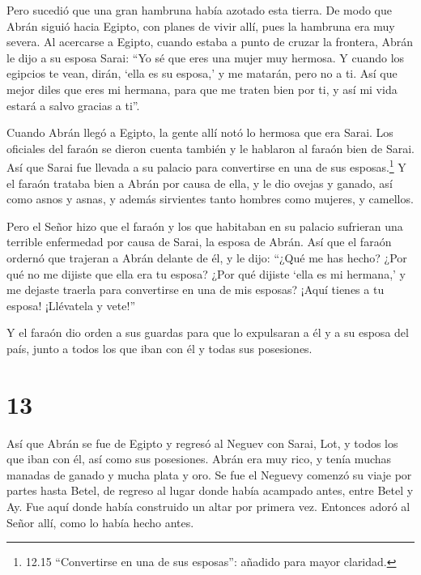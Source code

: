  Pero sucedió que una gran hambruna había azotado esta
tierra. De modo que Abrán siguió hacia Egipto, con planes de vivir allí,
pues la hambruna era muy severa.  Al acercarse a Egipto,
cuando estaba a punto de cruzar la frontera, Abrán le dijo a su esposa
Sarai: ``Yo sé que eres una mujer muy hermosa.  Y cuando
los egipcios te vean, dirán, `ella es su esposa,' y me matarán, pero no
a ti.  Así que mejor diles que eres mi hermana, para que me
traten bien por ti, y así mi vida estará a salvo gracias a ti''.

 Cuando Abrán llegó a Egipto, la gente allí notó lo hermosa
que era Sarai.  Los oficiales del faraón se dieron cuenta
también y le hablaron al faraón bien de Sarai. Así que Sarai fue llevada
a su palacio para convertirse en una de sus esposas.\footnote{12.15
  ``Convertirse en una de sus esposas'': añadido para mayor claridad.}
 Y el faraón trataba bien a Abrán por causa de ella, y le
dio ovejas y ganado, así como asnos y asnas, y además sirvientes tanto
hombres como mujeres, y camellos.

 Pero el Señor hizo que el faraón y los que habitaban en su
palacio sufrieran una terrible enfermedad por causa de Sarai, la esposa
de Abrán.  Así que el faraón ordernó que trajeran a Abrán
delante de él, y le dijo: ``¿Qué me has hecho? ¿Por qué no me dijiste
que ella era tu esposa?  ¿Por qué dijiste `ella es mi
hermana,' y me dejaste traerla para convertirse en una de mis esposas?
¡Aquí tienes a tu esposa! ¡Llévatela y vete!''

 Y el faraón dio orden a sus guardas para que lo expulsaran
a él y a su esposa del país, junto a todos los que iban con él y todas
sus posesiones.

\hypertarget{section-12}{%
\section{13}\label{section-12}}

 Así que Abrán se fue de Egipto y regresó al Neguev con
Sarai, Lot, y todos los que iban con él, así como sus posesiones.
 Abrán era muy rico, y tenía muchas manadas de ganado y
mucha plata y oro.  Se fue el Neguevy comenzó su viaje por
partes hasta Betel, de regreso al lugar donde había acampado antes,
entre Betel y Ay.  Fue aquí donde había construido un altar
por primera vez. Entonces adoró al Señor allí, como lo había hecho
antes.

